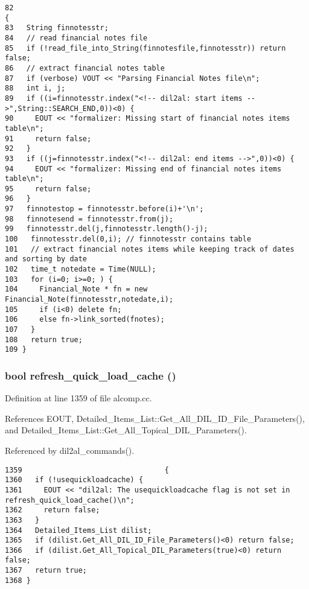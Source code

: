 \footnotesize\begin{verbatim}82                                                                                                              {
83   String finnotesstr;
84   // read financial notes file
85   if (!read_file_into_String(finnotesfile,finnotesstr)) return false;
86   // extract financial notes table
87   if (verbose) VOUT << "Parsing Financial Notes file\n";
88   int i, j;
89   if ((i=finnotesstr.index("<!-- dil2al: start items -->",String::SEARCH_END,0))<0) {
90     EOUT << "formalizer: Missing start of financial notes items table\n";
91     return false;
92   }
93   if ((j=finnotesstr.index("<!-- dil2al: end items -->",0))<0) {
94     EOUT << "formalizer: Missing end of financial notes items table\n";
95     return false;
96   }
97   finnotestop = finnotesstr.before(i)+'\n';
98   finnotesend = finnotesstr.from(j);
99   finnotesstr.del(j,finnotesstr.length()-j);
100   finnotesstr.del(0,i); // finnotesstr contains table
101   // extract financial notes items while keeping track of dates and sorting by date
102   time_t notedate = Time(NULL);
103   for (i=0; i>=0; ) {
104     Financial_Note * fn = new Financial_Note(finnotesstr,notedate,i);
105     if (i<0) delete fn;
106     else fn->link_sorted(fnotes);
107   }
108   return true;
109 }
\end{verbatim}\normalsize 
{}
\subsubsection{\setlength{\rightskip}{0pt plus 5cm}bool refresh\_\-quick\_\-load\_\-cache ()}\label{dil2al_8hh_a296}




Definition at line 1359 of file alcomp.cc.

References EOUT, Detailed\_\-Items\_\-List::Get\_\-All\_\-DIL\_\-ID\_\-File\_\-Parameters(), and Detailed\_\-Items\_\-List::Get\_\-All\_\-Topical\_\-DIL\_\-Parameters().

Referenced by dil2al\_\-commands().



\footnotesize\begin{verbatim}1359                                 {
1360   if (!usequickloadcache) {
1361     EOUT << "dil2al: The usequickloadcache flag is not set in refresh_quick_load_cache()\n";
1362     return false;
1363   }
1364   Detailed_Items_List dilist;
1365   if (dilist.Get_All_DIL_ID_File_Parameters()<0) return false;
1366   if (dilist.Get_All_Topical_DIL_Parameters(true)<0) return false;
1367   return true;
1368 }
\end{verbatim}\normalsize 
{}
